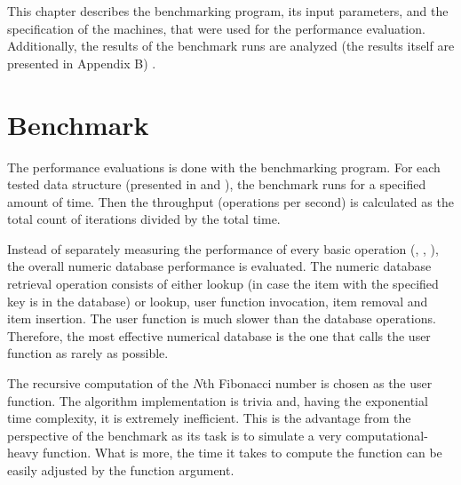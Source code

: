 This chapter describes the benchmarking program, its input parameters, and the specification of the machines, that were used for the performance evaluation. Additionally, the results of the benchmark runs are analyzed (the results itself are presented in Appendix B) .

\section{Benchmark}

The performance evaluations is done with the benchmarking program. For each tested data structure (presented in  and ), the benchmark runs for a specified amount of time. Then the throughput (operations per second) is calculated as the total count of iterations divided by the total time.

Instead of separately measuring the performance of every basic operation (\findop, \insertop, \removeop), the overall numeric database performance is evaluated. The numeric database retrieval operation consists of either lookup (in case the item with the specified key is in the database) or lookup, user function invocation, item removal and item insertion. The user function is much slower than the database operations. Therefore, the most effective numerical database is the one that calls the user function as rarely as possible.

The recursive computation of the $N$th Fibonacci number is chosen as the user function. The algorithm implementation is trivia and, having the exponential time complexity, it is extremely inefficient. This is the advantage from the perspective of the benchmark as its task is to simulate a very computational-heavy function. What is more, the time it takes to compute the function can be easily adjusted by the function argument.

\pagebreak


